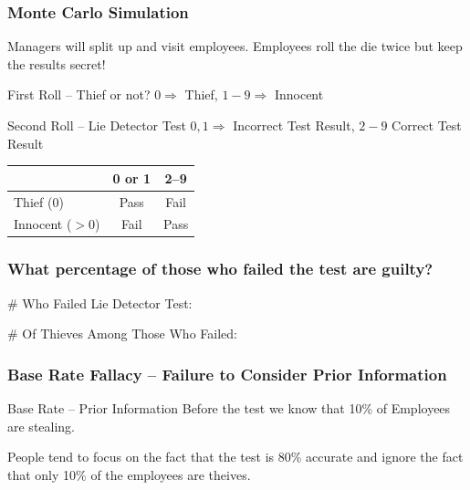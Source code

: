 \documentclass{beamer}
\begin{document}
\begin{frame}
\frametitle{Monte Carlo Simulation}
Managers will split up and visit employees. Employees roll the die twice \alert{but keep the results secret!}
\vspace{1em}
\begin{block}{First Roll -- Thief or not?}
$0 \Rightarrow$ Thief, $1-9 \Rightarrow$ Innocent
\end{block}

\begin{block}{Second Roll -- Lie Detector Test}
$0,1 \Rightarrow$ Incorrect Test Result, $2-9$ Correct Test Result
\end{block}
\begin{table}
	\begin{tabular}{l|cc}
	&0 or 1&2--9\\
	\hline
	Thief (0)&Pass&\alert{Fail}\\
	Innocent ($>0$)&\alert{Fail} &Pass
	\end{tabular}
\end{table}

\end{frame}
\begin{frame}
\frametitle{What percentage of those who failed the test are guilty?}
\begin{block}{\# Who Failed Lie Detector Test:}

\end{block}


\begin{block}{\# Of Thieves Among Those Who Failed:}

\end{block}

\end{frame}
\begin{frame}
\frametitle{Base Rate Fallacy -- Failure to Consider Prior Information}

\begin{block}{Base Rate -- Prior Information}
Before the test we know that 10\% of Employees are stealing.
\end{block}
\vspace{2em}
\begin{alertblock}{People tend to focus on the fact that the test is 80\% accurate and ignore the fact that only 10\% of the employees are theives. }
\end{alertblock}

\end{frame}
\end{document}
